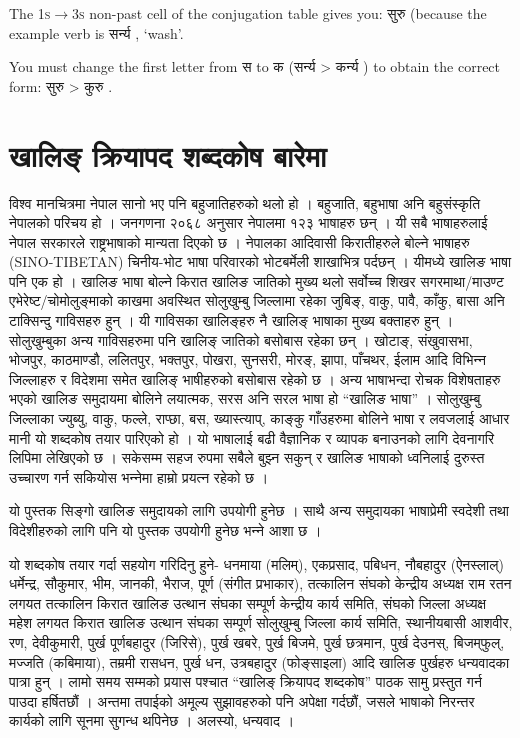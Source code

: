 The \textsc{1s$\rightarrow$3s} non-past cell of the conjugation table gives you: सुरु  (because the example verb is सर्न्य , `wash'.

You must change the first letter from स  to क  (सर्न्य  > कर्न्य ) to obtain the correct form: सुरु  > कुरु .

\cleardoublepage
\section{खालिङ् क्रियापद शब्दकोष बारेमा}
विश्व मानचित्रमा नेपाल सानो भए पनि बहुजातिहरुको थलो हो । बहुजाति, बहुभाषा अनि बहुसंस्कृति नेपालको परिचय हो । जनगणना २०६८ अनुसार नेपालमा १२३ भाषाहरु छन् । यी सबै भाषाहरुलाई नेपाल सरकारले राष्ट्रभाषाको मान्यता दिएको छ । नेपालका आदिवासी किरातीहरुले बोल्‍ने भाषाहरु (SINO-TIBETAN) चिनीय-भोट भाषा परिवारको भोटबर्मेली शाखाभित्र पर्दछन् । यीमध्ये खालिङ भाषा पनि एक हो । खालिङ भाषा बोल्‍ने किरात खालिङ जातिको मुख्य थलो सर्वोच्‍च शिखर सगरमाथा/माउण्ट एभेरेष्ट/चोमोलुङ्‍माको  काखमा अवस्थित सोलुखुम्बु जिल्‍लामा रहेका जुबिङ्, वाकु, पावै, काँकु, बासा अनि टाक्सिन्दु गा‍‍विसहरु हुन् । यी गाविसका खालिङ्‍हरु नै खालिङ् भाषाका मुख्य बक्ताहरु हुन् । सोलुखुम्बुका अन्य गाविसहरुमा पनि खालिङ् जातिको बसोबास रहेका छन् । खोटाङ्, संखुवासभा, भोजपुर, काठमाण्डौ, ललितपुर, भक्तपुर, पोखरा, सुनसरी, मोरङ्, झापा, पाँचथर, ईलाम आदि विभिन्‍न जिल्‍लाहरु र विदेशमा समेत खालिङ् भाषीहरुको बसोबास रहेको छ । 
अन्य भाषाभन्दा रोचक विशेषताहरु भएको खालिङ समुदायमा बोलिने लयात्मक, सरस अनि सरल भाषा हो “खालिङ भाषा” । सोलुखुम्बु जिल्‍लाका ज्युब्यु, वाकु, फल्‍ले, राप्छा, बस, ख्यास्त्याप्, काङ्‍कु गाँउहरुमा बोलिने भाषा र लवजलाई आधार मानी यो शब्दकोष तयार पारिएको हो । यो भाषालाई बढी वैज्ञानिक र व्यापक बनाउनको लागि देवनागरि लिपिमा लेखिएको छ । सकेसम्म सहज रुपमा सबैले बुझ्‍न सकुन् र खालिङ भाषाको ध्वनिलाई दुरुस्त उच्‍चारण गर्न सकियोस भन्‍नेमा हाम्रो प्रयत्‍न रहेको छ । 

यो पुस्तक सिङ्‍गो खालिङ समुदायको लागि उपयोगी हुनेछ । साथै अन्य समुदायका भाषाप्रेमी स्वदेशी तथा विदेशीहरुको लागि पनि यो पुस्तक उपयोगी हुनेछ भन्‍ने आशा छ । 

यो शब्दकोष तयार गर्दा सहयोग गरिदिनु हुने- धनमाया (मलिम्), एकप्रसाद, पबिधन, नौबहादुर (ऐनस्लाल्) धर्मेन्द्र, सौकुमार, भीम, जानकी, भैराज, पूर्ण (संगीत प्रभाकार), तत्कालिन संघको केन्द्रीय अध्यक्ष राम रतन लगयत तत्कालिन किरात खालिङ उत्थान संघका सम्पूर्ण केन्द्रीय कार्य समिति, संघको जिल्‍ला अध्यक्ष महेश लगयत किरात खालिङ उत्थान संघका सम्पूर्ण सोलुखुम्बु जिल्‍ला कार्य समिति, स्थानीयबासी आशवीर, रण, देवीकुमारी, पुर्ख पूर्णबहादुर (जिरिसे), पुर्ख खबरे, पुर्ख बिजमे, पुर्ख छत्रमान, पुर्ख देउनस्, बिजम्‌फुल्, मज्जति (कबिमाया), तम्रमी रासधन, पुर्ख धन, उत्रबहादुर (फोङ्‍साइला) आदि खालिङ पुर्खहरु धन्यवादका पात्रा हुन् ।
लामो समय सम्मको प्रयास पश्चात “खालिङ् क्रियापद शब्दकोष” पाठक सामु प्रस्तुत गर्न पाउदा हर्षितछौं । अन्तमा तपाईको अमूल्य सुझावहरुको पनि अपेक्षा गर्दछौं, जसले भाषाको निरन्तर कार्यको लागि सूनमा सुगन्ध थपिनेछ ।
अलस्यो, धन्यवाद ।

